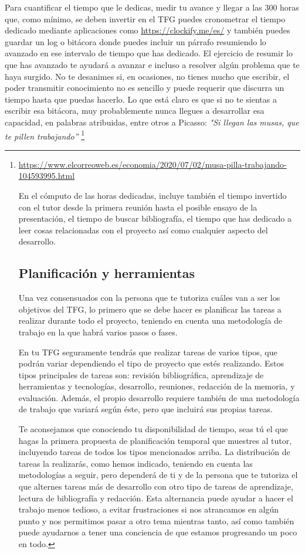 Para cuantificar el tiempo que le dedicas, medir tu avance y llegar a las 300 horas que, como mínimo, se deben invertir en el TFG puedes cronometrar el tiempo dedicado mediante aplicaciones como \url{https://clockify.me/es/} y también puedes guardar un log o bitácora donde puedes incluir un párrafo resumiendo lo avanzado en ese intervalo de tiempo que has dedicado. El ejercicio de resumir lo que has avanzado te ayudará a avanzar e incluso a resolver algún problema que te haya surgido. No te desanimes si, en ocasiones, no tienes mucho que escribir, el poder transmitir conocimiento no es sencillo y puede requerir que discurra un tiempo hasta que puedas hacerlo. Lo que está claro es que si no te sientas a escribir esa bitácora, muy probablemente nunca llegues a desarrollar esa capacidad, en palabras atribuidas, entre otros a Picasso: {\it "Si llegan las musas, que te pillen trabajando”} \footnote{\url{https://www.elcorreoweb.es/economia/2020/07/02/musa-pilla-trabajando-104593995.html} 

En el cómputo de las horas dedicadas, incluye también el tiempo invertido con el tutor desde la primera reunión hasta el posible ensayo de la presentación, el tiempo de buscar bibliografía, el tiempo que has dedicado a leer cosas relacionadas con el proyecto así como cualquier aspecto del desarrollo.



\subsection{Planificación y herramientas} %
Una vez consensuados con la persona que te tutoriza cuáles van a ser los objetivos del TFG, lo primero que se debe hacer es planificar las tareas a realizar durante todo el proyecto, teniendo en cuenta una metodología de trabajo en la que habrá varios pasos o fases.

En tu TFG seguramente tendrás que realizar tareas de varios tipos, que podrán variar dependiendo el tipo de proyecto que estés realizando. Estos tipos principales de tareas son: revisión bibliográfica, aprendizaje de herramientas y tecnologías, desarrollo, reuniones, redacción de la memoria, y evaluación. Además, el propio desarrollo requiere también de una metodología de trabajo que variará según éste, pero que incluirá sus propias tareas.

Te aconsejamos que conociendo tu disponibilidad de tiempo, seas tú el que hagas la primera propuesta de planificación temporal que muestres al tutor, incluyendo tareas de todos los tipos mencionados arriba. La distribución de tareas la realizarás, como hemos indicado, teniendo en cuenta las metodologías a seguir, pero dependerá de ti y de la persona que te tutoriza el que alternes tareas más de desarrollo con otro tipo de tareas de aprendizaje, lectura de bibliografía y redacción. Esta alternancia puede ayudar a hacer el trabajo menos tedioso, a evitar frustraciones si nos atrancamos en algún punto y nos permitimos pasar a otro tema mientras tanto, así como también puede ayudarnos a tener una conciencia de que estamos progresando un poco en todo. 

}

